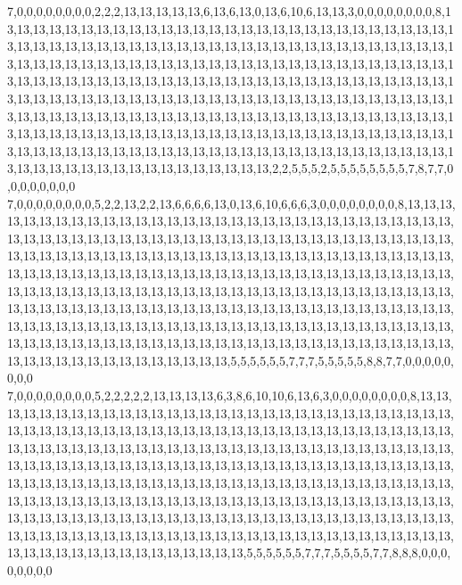 7,0,0,0,0,0,0,0,0,2,2,2,13,13,13,13,13,6,13,6,13,0,13,6,10,6,13,13,3,0,0,0,0,0,0,0,0,8,13,13,13,13,13,13,13,13,13,13,13,13,13,13,13,13,13,13,13,13,13,13,13,13,13,13,13,13,13,13,13,13,13,13,13,13,13,13,13,13,13,13,13,13,13,13,13,13,13,13,13,13,13,13,13,13,13,13,13,13,13,13,13,13,13,13,13,13,13,13,13,13,13,13,13,13,13,13,13,13,13,13,13,13,13,13,13,13,13,13,13,13,13,13,13,13,13,13,13,13,13,13,13,13,13,13,13,13,13,13,13,13,13,13,13,13,13,13,13,13,13,13,13,13,13,13,13,13,13,13,13,13,13,13,13,13,13,13,13,13,13,13,13,13,13,13,13,13,13,13,13,13,13,13,13,13,13,13,13,13,13,13,13,13,13,13,13,13,13,13,13,13,13,13,13,13,13,13,13,13,13,13,13,13,13,13,13,13,13,13,13,13,13,13,13,13,13,13,13,13,13,13,13,13,13,13,13,13,13,13,13,13,13,13,13,13,13,13,13,13,13,13,13,13,13,13,13,13,13,13,13,13,13,13,13,13,13,13,13,13,13,2,2,5,5,5,2,5,5,5,5,5,5,5,5,7,8,7,7,0,0,0,0,0,0,0,0
7,0,0,0,0,0,0,0,0,5,2,2,13,2,2,13,6,6,6,6,13,0,13,6,10,6,6,6,3,0,0,0,0,0,0,0,0,8,13,13,13,13,13,13,13,13,13,13,13,13,13,13,13,13,13,13,13,13,13,13,13,13,13,13,13,13,13,13,13,13,13,13,13,13,13,13,13,13,13,13,13,13,13,13,13,13,13,13,13,13,13,13,13,13,13,13,13,13,13,13,13,13,13,13,13,13,13,13,13,13,13,13,13,13,13,13,13,13,13,13,13,13,13,13,13,13,13,13,13,13,13,13,13,13,13,13,13,13,13,13,13,13,13,13,13,13,13,13,13,13,13,13,13,13,13,13,13,13,13,13,13,13,13,13,13,13,13,13,13,13,13,13,13,13,13,13,13,13,13,13,13,13,13,13,13,13,13,13,13,13,13,13,13,13,13,13,13,13,13,13,13,13,13,13,13,13,13,13,13,13,13,13,13,13,13,13,13,13,13,13,13,13,13,13,13,13,13,13,13,13,13,13,13,13,13,13,13,13,13,13,13,13,13,13,13,13,13,13,13,13,13,13,13,13,13,13,13,13,13,13,13,13,13,13,13,13,13,13,13,13,13,13,13,13,13,13,13,13,13,5,5,5,5,5,5,7,7,7,5,5,5,5,5,8,8,7,7,0,0,0,0,0,0,0,0
7,0,0,0,0,0,0,0,0,5,2,2,2,2,2,13,13,13,13,6,3,8,6,10,10,6,13,6,3,0,0,0,0,0,0,0,0,8,13,13,13,13,13,13,13,13,13,13,13,13,13,13,13,13,13,13,13,13,13,13,13,13,13,13,13,13,13,13,13,13,13,13,13,13,13,13,13,13,13,13,13,13,13,13,13,13,13,13,13,13,13,13,13,13,13,13,13,13,13,13,13,13,13,13,13,13,13,13,13,13,13,13,13,13,13,13,13,13,13,13,13,13,13,13,13,13,13,13,13,13,13,13,13,13,13,13,13,13,13,13,13,13,13,13,13,13,13,13,13,13,13,13,13,13,13,13,13,13,13,13,13,13,13,13,13,13,13,13,13,13,13,13,13,13,13,13,13,13,13,13,13,13,13,13,13,13,13,13,13,13,13,13,13,13,13,13,13,13,13,13,13,13,13,13,13,13,13,13,13,13,13,13,13,13,13,13,13,13,13,13,13,13,13,13,13,13,13,13,13,13,13,13,13,13,13,13,13,13,13,13,13,13,13,13,13,13,13,13,13,13,13,13,13,13,13,13,13,13,13,13,13,13,13,13,13,13,13,13,13,13,13,13,13,13,13,13,13,13,13,5,5,5,5,5,5,7,7,7,5,5,5,5,7,7,8,8,8,0,0,0,0,0,0,0,0
